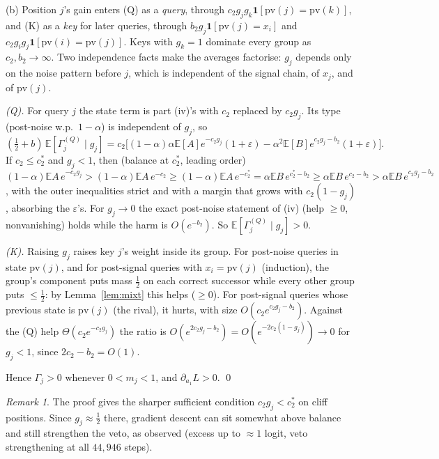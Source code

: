 \documentclass[11pt]{article}
\theoremstyle{definition}\newtheorem{assumption}{Assumption}\newtheorem{definition}{Definition}
\theoremstyle{remark}\newtheorem{remark}{Remark}
\newcommand{\1}{\mathbf{1}}\newcommand{\E}{\mathbb E}
\begin{document}
(b) Position $j$'s gain enters (Q) as a \emph{query}, through $c_2g_jg_k\1[\mathrm{pv}(j)=\mathrm{pv}(k)]$, and (K) as a
\emph{key} for later queries, through $b_2g_j\1[\mathrm{pv}(j)=x_i]$ and $c_2g_ig_j\1[\mathrm{pv}(i)=\mathrm{pv}(j)]$. Keys with
$g_k=1$ dominate every group as $c_2,b_2\to\infty$. Two independence facts make the averages factorise:
$g_j$ depends only on the noise pattern before $j$, which is independent of the signal chain, of
$x_j$, and of $\mathrm{pv}(j)$.

\emph{(Q).} For query $j$ the state term is part (iv)'s with $c_2$ replaced by $c_2g_j$. Its type
(post-noise w.p.\ $1-\alpha$) is independent of $g_j$, so
\[
(\tfrac12+b)\,\E[\Gamma^{(Q)}_j\mid g_j]=c_2\Big[(1-\alpha)\alpha\E[A]e^{-c_2g_j}(1+\varepsilon)-\alpha^2\E[B]e^{c_2g_j-b_2}(1+\varepsilon)\Big].
\]
If $c_2\le c_2^\ast$ and $g_j<1$, then (balance at $c_2^\ast$, leading order)
$(1-\alpha)\E A\,e^{-c_2g_j}>(1-\alpha)\E A\,e^{-c_2}\ge(1-\alpha)\E A\,e^{-c_2^\ast}=\alpha\E B\,e^{c_2^\ast-b_2}\ge\alpha\E B\,e^{c_2-b_2}>\alpha\E B\,e^{c_2g_j-b_2}$,
with the outer inequalities strict and with a margin that grows with $c_2(1-g_j)$, absorbing the $\varepsilon$'s.
For $g_j\to0$ the exact post-noise statement of (iv) (help $\ge0$, nonvanishing) holds while the harm is
$O(e^{-b_2})$. So $\E[\Gamma^{(Q)}_j\mid g_j]>0$.

\emph{(K).} Raising $g_j$ raises key $j$'s weight inside its group. For post-noise queries in state
$\mathrm{pv}(j)$, and for post-signal queries with $x_i=\mathrm{pv}(j)$ (induction), the group's component puts mass
$\tfrac12$ on each correct successor while every other group puts $\le\tfrac12$: by Lemma~\ref{lem:mixt} this
helps ($\ge0$). For post-signal queries whose previous state is $\mathrm{pv}(j)$ (the rival), it hurts, with
size $O(c_2e^{c_2g_j-b_2})$. Against the (Q) help $\Theta(c_2e^{-c_2g_j})$ the ratio is
$O(e^{2c_2g_j-b_2})=O(e^{-2c_2(1-g_j)})\to0$ for $g_j<1$, since $2c_2-b_2=O(1)$.

Hence $\Gamma_j>0$ whenever $0<m_j<1$, and $\partial_{a_1}L>0$. \qed

\begin{remark}
The proof gives the sharper sufficient condition $c_2g_j<c_2^\ast$ on cliff positions. Since $g_j\approx\frac12$
there, gradient descent can sit somewhat above balance and still strengthen the veto, as observed
(excess up to $\approx1$ logit, veto strengthening at all $44{,}946$ steps).
\end{remark}
\end{document}
